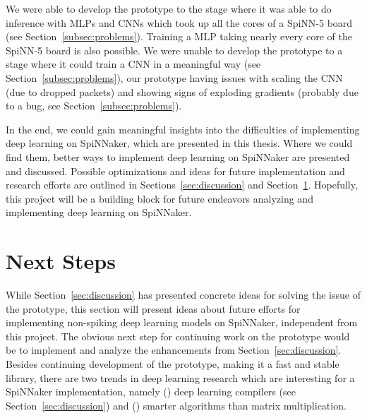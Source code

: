\documentclass[]{article}
\begin{document}
We were able to develop the prototype to the stage where it was able
to do inference with MLPs and CNNs which took up all the cores of a
SpiNN-5 board (see Section~\ref{subsec:problems}).
Training a MLP taking nearly every core of the SpiNN-5 board is also
possible.
We were unable to develop the prototype to a stage where it could
train a CNN in a meaningful way (see Section~\ref{subsec:problems}),
our prototype having issues with scaling the CNN (due to dropped
packets) and showing signs of exploding gradients (probably due to
a bug, see Section~\ref{subsec:problems}).

In the end, we could gain meaningful insights into the difficulties of
implementing deep learning on SpiNNaker, which are presented in this
thesis.
Where we could find them, better ways to implement deep learning on
SpiNNaker are presented and discussed.
Possible optimizations and ideas for future implementation and
research efforts are outlined in Sections~\ref{sec:discussion} and
Section~\ref{sec:next_steps}.
Hopefully, this project will be a building block for future endeavors
analyzing and implementing deep learning on SpiNNaker.




\section{Next Steps} %
\label{sec:next_steps}

While Section~\ref{sec:discussion} has presented concrete ideas for
solving the issue of the prototype, this section will present ideas
about future efforts for implementing non-spiking deep learning models
on SpiNNaker, independent from this project.
The obvious next step for continuing work on the prototype would be
to implement and analyze the enhancements from
Section~\ref{sec:discussion}.
Besides continuing development of the prototype, making it a fast
and stable library, there are two trends in deep learning research
which are interesting for a SpiNNaker implementation, namely
() deep learning compilers
(see Section~\ref{sec:discussion}) and ()
smarter algorithms than matrix multiplication.
\end{document}
